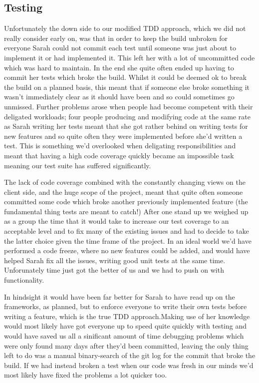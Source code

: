\subsection{Testing}
  Unfortunately the down side to our modified TDD approach, which we did not really consider early on, was that in order to keep the build unbroken for everyone Sarah could not commit each test until someone was just about to implement it or had implemented it. This left her with a lot of uncommitted code which was hard to maintain. In the end she quite often ended up having to commit her tests which broke the build. Whilst it could be deemed ok to break the build on a planned basis, this meant that if someone else broke something it wasn't immediately clear as it should have been and so could sometimes go unmissed. Further problems arose when people had become competent with their deligated workloads; four people producing and modifying code at the same rate as Sarah writing her tests meant that she got rather behind on writing tests for new features and so quite often they were implemented before she'd written a test. This is something we'd overlooked when deligating responsibilities and meant that having a high code coverage quickly became an impossible task meaning our test suite has suffered significantly.

  The lack of code coverage combined with the constantly changing views on the client side, and the huge scope of the project, meant that quite often someone committed some code which broke another previously implemented feature (the fundamental thing tests are meant to catch!) After one stand up we weighed up as a group the time that it would take to increase our test coverage to an acceptable level and to fix many of the existing issues and had to decide to take the latter choice given the time frame of the project. In an ideal world we'd have performed a code freeze, where no new features could be added, and would have helped Sarah fix all the issues, writing good unit tests at the same time. Unforunately time just got the better of us and we had to push on with functionality.

  In hindsight it would have been far better for Sarah to have read up on the frameworks, as planned, but to enforce everyone to write their own tests before writing a feature, which is the true TDD approach.Making use of her knowledge would most likely have got everyone up to speed quite quickly with testing and would have saved us all a sinificant amount of time debugging problems which were only found many days after they'd been committed, leaving the only thing left to do was a manual binary-search of the git log for the commit that broke the build. If we had instead broken a test when our code was fresh in our minds we'd most likely have fixed the problems a lot quicker too.